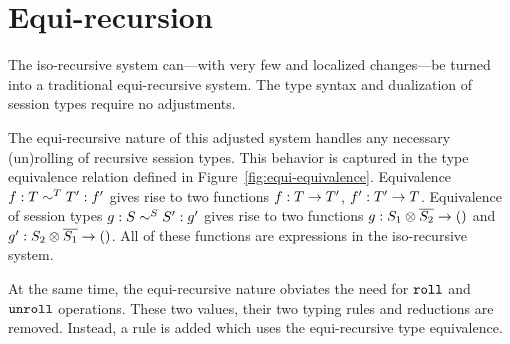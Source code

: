 \section{Equi-recursion}

The iso-recursive system can---with very few and localized changes---be turned
into a traditional equi-recursive system. The type syntax and dualization of
session types require no adjustments.



The equi-recursive nature of this adjusted system handles any necessary
(un)rolling of recursive session types. This behavior is captured in the type
equivalence relation defined in Figure~\ref{fig:equi-equivalence}. Equivalence
$f : T \eqt T' : f'$ gives rise to two functions $f : \TFun {T} {T'}$, $f' :
\TFun {T'} {T}$. Equivalence of session types $g : S \eqs S' : g'$ gives rise
to two functions $g : \TFun {\TPair {S_1} {\TDual{S_2}}} \TUnit$ and $g' :
\TFun {\TPair {S_2} {\TDual{S_1}}} \TUnit$. All of these functions are
expressions in the iso-recursive system.

At the same time, the equi-recursive nature obviates the need for $\EkwRoll$
and $\EkwUnroll$ operations. These two values, their two typing rules and
reductions are removed. Instead, a rule is added which uses the equi-recursive
type equivalence.
\begin{mathpar}
\end{mathpar}


% 

